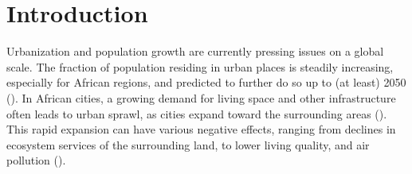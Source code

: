 \documentclass[11pt, A4, oneside]{report}
\begin{document}





%
   

\newpage
\renewcommand*\contentsname{Contents}
\bgroup
\tableofcontents
\egroup

\newpage
\chapter{Introduction}
Urbanization and population growth are currently pressing issues on a global scale. The fraction of population residing in urban places is steadily increasing, especially for African regions, and predicted to further do so up to (at least) 2050 (\cite{united2012world}). In African cities, a growing demand for living space and other infrastructure often leads to urban sprawl, as cities expand toward the surrounding areas (\cite{Shao.2021, Xu.2019}).%
This rapid expansion can have various negative effects, ranging from declines in ecosystem services of the surrounding land, to lower living quality, and air pollution (\cite{Shao.2021}).
\end{document}
